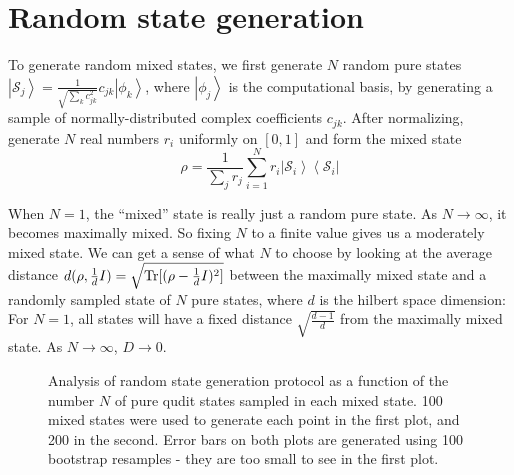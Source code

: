 \documentclass{article}
\begin{document}
\section{Random state generation}

\label{sec:random_state_gen}

To generate random mixed states, we first generate $N$ random pure states $\left|\mathcal S_j\right>=\frac{1}{\sqrt{\sum_k c_{jk}^2}}c_{jk}\left|\phi_k\right>$, where $\left|\phi_j\right>$ is the computational basis, by generating a sample of normally-distributed complex coefficients $c_{jk}$. After normalizing, generate $N$ real numbers $r_i$ uniformly on $[0,1]$ and form the mixed state
\begin{equation}\rho=\frac{1}{\sum_j r_j}\sum_{i=1}^N  r_i\left|\mathcal S_i\right>\left<\mathcal S_i\right|\end{equation}

When $N=1$, the ``mixed'' state is really just a random pure state. As $N\to\infty$, it becomes maximally mixed. So fixing $N$ to a finite value gives us a moderately mixed state. We can get a sense of what $N$ to choose by looking at the average distance $d(\rho,\frac{1}{d} I)=\sqrt{\operatorname{Tr}[(\rho-\frac{1}{d}I)^2]}$ between the maximally mixed state and a randomly sampled state of $N$ pure states, where $d$ is the hilbert space dimension: For $N=1$, all states will have a fixed distance $\sqrt{\frac{d-1}{d}}$ from the maximally mixed state. As $N\to \infty$, $D\to 0$.

\begin{figure}[H]
\centering
{}\hspace{1.5em} 
\caption{Analysis of random state generation protocol as a function of the number $N$ of pure qudit states sampled in each mixed state. 100 mixed states were used to generate each point in the first plot, and 200 in the second. Error bars on both plots are generated using 100 bootstrap resamples - they are too small to see in the first plot.}
\end{figure}
\end{document}
